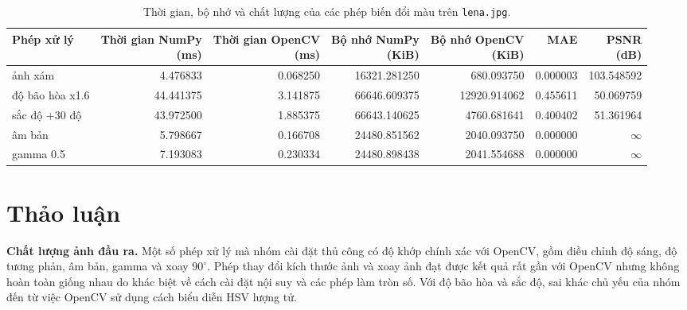 \documentclass[12pt]{article}
\newcommand{\runin}[1]{\par\medskip\noindent\textbf{#1}\hspace{0.4em}\ignorespaces}
\newcommand{\infpsnr}{$\infty$}
\numberwithin{equation}{section}
\begin{document}
\begin{table}[H]
\centering
\caption{Thời gian, bộ nhớ và chất lượng của các phép biến đổi màu trên
\texttt{lena.jpg}.}
\label{tab:color-results}
\begin{adjustbox}{max width=\linewidth}
\begin{tabular}{lrrrrrr}
\toprule
\textbf{Phép xử lý} &
\shortstack{\textbf{Thời gian NumPy}\\\textbf{(ms)}} &
\shortstack{\textbf{Thời gian OpenCV}\\\textbf{(ms)}} &
\shortstack{\textbf{Bộ nhớ NumPy}\\\textbf{(KiB)}} &
\shortstack{\textbf{Bộ nhớ OpenCV}\\\textbf{(KiB)}} &
\textbf{MAE} &
\shortstack{\textbf{PSNR}\\\textbf{(dB)}} \\
\midrule
ảnh xám          & 4.476833  & 0.068250 & 16321.281250 & 680.093750   & 0.000003 & 103.548592 \\
độ bão hòa x1.6  & 44.441375 & 3.141875 & 66646.609375 & 12920.914062 & 0.455611 & 50.069759 \\
sắc độ +30 độ    & 43.972500 & 1.885375 & 66643.140625 & 4760.681641  & 0.400402 & 51.361964 \\
âm bản           & 5.798667  & 0.166708 & 24480.851562 & 2040.093750  & 0.000000 & \infpsnr \\
gamma 0.5        & 7.193083  & 0.230334 & 24480.898438 & 2041.554688  & 0.000000 & \infpsnr \\
\bottomrule
\end{tabular}
\end{adjustbox}
\end{table}

\section{Thảo luận}

\runin{Chất lượng ảnh đầu ra.} Một số phép xử lý mà nhóm cài đặt thủ công có độ khớp chính xác với OpenCV, gồm điều chỉnh độ sáng,
độ tương phản, âm bản, gamma và xoay $90^\circ$. Phép thay đổi kích thước ảnh và xoay ảnh đạt được kết quả rất gần với OpenCV nhưng không hoàn toàn giống nhau do khác biệt về cách cài đặt nội suy và các phép làm tròn số. Với độ bão hòa và sắc độ, sai khác chủ yếu của nhóm đến từ việc OpenCV sử dụng cách biểu diễn
HSV lượng tử.
\end{document}
